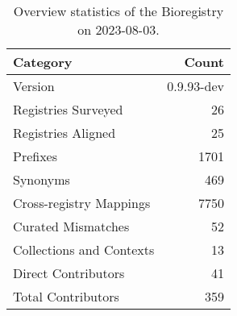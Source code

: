 \begin{table}
\caption{Overview statistics of the Bioregistry on 2023-08-03.}
\label{tab:bioregistry-summary}
\begin{tabular}{lr}
\toprule
Category & Count \\
\midrule
Version & 0.9.93-dev \\
Registries Surveyed & 26 \\
Registries Aligned & 25 \\
Prefixes & 1701 \\
Synonyms & 469 \\
Cross-registry Mappings & 7750 \\
Curated Mismatches & 52 \\
Collections and Contexts & 13 \\
Direct Contributors & 41 \\
Total Contributors & 359 \\
\bottomrule
\end{tabular}
\end{table}
